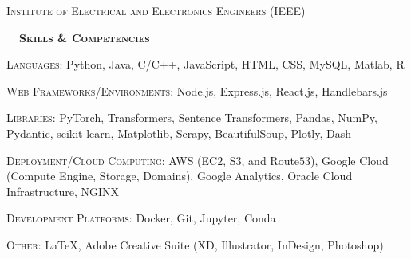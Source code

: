 \documentclass[hidelinks, 10pt]{article}
\def\sectionspacing{6mm}            %
\def\sectiontocontentspacing{4mm}   %
\renewcommand{\section}[1]{
    {\fontsize{14}{14}\selectfont \textsc{\textbf{\ \ #1\ \ }}}\hrulefill
}
\begin{document}
{\vspace{0.5mm}

\begin{minipage}[ct]{0.9\linewidth}
    \textsc{Institute of Electrical and Electronics Engineers} (IEEE)
\end{minipage}

\vspace{\sectionspacing}


\section{Skills \& Competencies}

\vspace{\sectiontocontentspacing}

\begin{minipage}[ct]{0.9\linewidth}
    \textsc{Languages: } Python, Java, C/C++, JavaScript, HTML, CSS, MySQL, Matlab, R



    \vspace{1.5mm}

    \textsc{Web Frameworks/Environments: } Node.js, Express.js, React.js, Handlebars.js

    \vspace{1.5mm}

    \textsc{Libraries: } PyTorch, Transformers, Sentence Transformers, Pandas, NumPy, Pydantic, scikit-learn, Matplotlib, Scrapy,
    BeautifulSoup, Plotly, Dash

    \vspace{1.5mm}

    \textsc{Deployment/Cloud Computing:} AWS (EC$2$, S$3$, and Route$53$),
    Google Cloud (Compute Engine, Storage, Domains), Google Analytics, Oracle Cloud Infrastructure, NGINX

    \vspace{1.5mm}

    \textsc{Development Platforms: } Docker, Git, Jupyter, Conda



    \vspace{1.5mm}

    \textsc{Other: } \LaTeX, Adobe Creative Suite (XD, Illustrator, InDesign, Photoshop)
\end{minipage}

}
\end{document}
